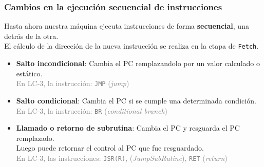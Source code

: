 \documentclass[aspectratio=169]{beamer}
\begin{document}
\begin{frame}[t,fragile]
    \frametitle{Cambios en la ejecución secuencial de instrucciones}
    \small
    \textcolor{verdeuca}{Hasta ahora nuestra máquina ejecuta instrucciones de forma \textbf{secuencial}, una detrás de la otra.}\\
    \vspace{0.2cm}
    El cálculo de la dirección de la nueva instrucción se realiza en la etapa de \texttt{Fetch}.\\
    \bigskip
    \bigskip
    \begin{itemize}
     \item<3-> \textcolor{naranjauca}{\textbf{Salto incondicional}}: Cambia el PC remplazandolo por un valor calculado o estático.\\
     \textcolor{gray}{En LC-3, la instrucción: \texttt{JMP} (\emph{jump})}
     \item<4-> \textcolor{naranjauca}{\textbf{Salto condicional}}: Cambia el PC si se cumple una determinada condición.\\
     \textcolor{gray}{En LC-3, la instrucción: \texttt{BR} (\emph{conditional branch})}
     \item<5-> \textcolor{naranjauca}{\textbf{Llamado o retorno de subrutina}}: Cambia el PC y resguarda el PC remplazado.\\ Luego puede retornar el control al PC que fue resguardado.\\
     \textcolor{gray}{En LC-3, las instrucciones: \texttt{JSR(R)}, (\emph{JumpSubRutine}), \texttt{RET} (\emph{return})}
    \end{itemize}
\end{frame}
\end{document}
